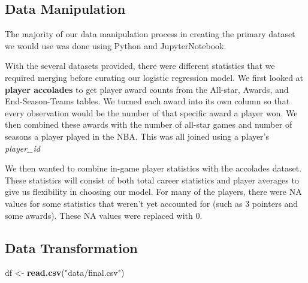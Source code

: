 \documentclass[
  11pt,
]{article}
\newenvironment{Shaded}{\begin{snugshade}}{\end{snugshade}}
\newcommand{\FunctionTok}[1]{\textcolor[rgb]{0.13,0.29,0.53}{\textbf{#1}}}
\newcommand{\NormalTok}[1]{#1}
\newcommand{\OtherTok}[1]{\textcolor[rgb]{0.56,0.35,0.01}{#1}}
\newcommand{\StringTok}[1]{\textcolor[rgb]{0.31,0.60,0.02}{#1}}
\begin{document}
\subsection{Data Manipulation}\label{data-manipulation}

The majority of our data manipulation process in creating the primary
dataset we would use was done using Python and JupyterNotebook.

With the several datasets provided, there were different statistics that
we required merging before curating our logistic regression model. We
first looked at \textbf{player accolades} to get player award counts
from the All-star, Awards, and End-Season-Teams tables. We turned each
award into its own column so that every observation would be the number
of that specific award a player won. We then combined these awards with
the number of all-star games and number of seasons a player played in
the NBA. This was all joined using a player's \emph{player\_id}

We then wanted to combine in-game player statistics with the accolades
dataset. These statistics will consist of both total career statistics
and player averages to give us flexibility in choosing our model. For
many of the players, there were NA values for some statistics that
weren't yet accounted for (such as 3 pointers and some awards). These NA
values were replaced with 0.

\subsection{Data Transformation}\label{data-transformation}

\begin{Shaded}
\begin{Highlighting}[]
\NormalTok{df }\OtherTok{\textless{}{-}} \FunctionTok{read.csv}\NormalTok{(}\StringTok{"data/final.csv"}\NormalTok{)}
\end{Highlighting}
\end{Shaded}
\end{document}
